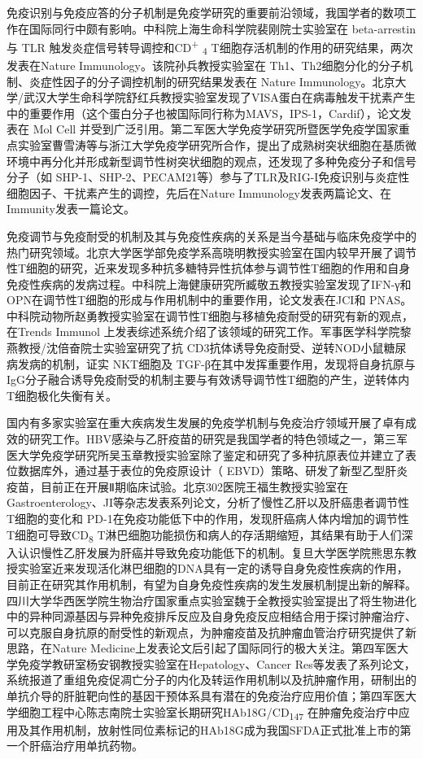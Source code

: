 免疫识别与免疫应答的分子机制是免疫学研究的重要前沿领域，我国学者的数项工作在国际同行中颇有影响。中科院上海生命科学院裴刚院士实验室在
beta-arrestin与 TLR 触发炎症信号转导调控和CD\textsuperscript{+}
\textsubscript{4} T细胞存活机制的作用的研究结果，两次发表在Nature
Immunology。该院孙兵教授实验室在
Th1、Th2细胞分化的分子机制、炎症性因子的分子调控机制的研究结果发表在
Nature
Immunology。北京大学/武汉大学生命科学院舒红兵教授实验室发现了VISA蛋白在病毒触发干扰素产生中的重要作用（这个蛋白分子也被国际同行称为MAVS，IPS-1，Cardif），论文发表在
Mol Cell
并受到广泛引用。第二军医大学免疫学研究所暨医学免疫学国家重点实验室曹雪涛等与浙江大学免疫学研究所合作，提出了成熟树突状细胞在基质微环境中再分化并形成新型调节性树突状细胞的观点，还发现了多种免疫分子和信号分子（如
SHP-1、SHP-2、PECAM21等）参与了TLR及RIG-I免疫识别与炎症性细胞因子、干扰素产生的调控，先后在Nature
Immunology发表两篇论文、在 Immunity发表一篇论文。

免疫调节与免疫耐受的机制及其与免疫性疾病的关系是当今基础与临床免疫学中的热门研究领域。北京大学医学部免疫学系高晓明教授实验室在国内较早开展了调节性T细胞的研究，近来发现多种抗多糖特异性抗体参与调节性T细胞的作用和自身免疫性疾病的发病过程。中科院上海健康研究所臧敬五教授实验室发现了IFN-γ和OPN在调节性T细胞的形成与作用机制中的重要作用，论文发表在JCI和
PNAS。中科院动物所赵勇教授实验室在调节性T细胞与移植免疫耐受的研究有新的观点，在Trends
Immunol
上发表综述系统介绍了该领域的研究工作。军事医学科学院黎燕教授/沈倍奋院士实验室研究了抗
CD3抗体诱导免疫耐受、逆转NOD小鼠糖尿病发病的机制，证实 NKT细胞及
TGF-β在其中发挥重要作用，发现将自身抗原与
IgG分子融合诱导免疫耐受的机制主要与有效诱导调节性T细胞的产生，逆转体内
T细胞极化失衡有关。

国内有多家实验室在重大疾病发生发展的免疫学机制与免疫治疗领域开展了卓有成效的研究工作。HBV感染与乙肝疫苗的研究是我国学者的特色领域之一，第三军医大学免疫学研究所吴玉章教授实验室除了鉴定和研究了多种抗原表位并建立了表位数据库外，通过基于表位的免疫原设计（
EBVD）策略、研发了新型乙型肝炎疫苗，目前正在开展Ⅱ期临床试验。北京302医院王福生教授实验室在Gastroenterology、JI等杂志发表系列论文，分析了慢性乙肝以及肝癌患者调节性T细胞的变化和
PD-1在免疫功能低下中的作用，发现肝癌病人体内增加的调节性T细胞可导致CD\textsubscript{8}
T淋巴细胞功能损伤和病人的存活期缩短，其结果有助于人们深入认识慢性乙肝发展为肝癌并导致免疫功能低下的机制。复旦大学医学院熊思东教授实验室近来发现活化淋巴细胞的DNA具有一定的诱导自身免疫性疾病的作用，目前正在研究其作用机制，有望为自身免疫性疾病的发生发展机制提出新的解释。四川大学华西医学院生物治疗国家重点实验室魏于全教授实验室提出了将生物进化中的异种同源基因与异种免疫排斥反应及自身免疫反应相结合用于探讨肿瘤治疗、可以克服自身抗原的耐受性的新观点，为肿瘤疫苗及抗肿瘤血管治疗研究提供了新思路，在Nature
Medicine上发表论文后引起了国际同行的极大关注。第四军医大学免疫学教研室杨安钢教授实验室在Hepatology、Cancer
Res等发表了系列论文，系统报道了重组免疫促凋亡分子的内化及转运作用机制以及抗肿瘤作用，研制出的单抗介导的肝脏靶向性的基因干预体系具有潜在的免疫治疗应用价值；第四军医大学细胞工程中心陈志南院士实验室长期研究HAb18G/CD\textsubscript{147}
在肿瘤免疫治疗中应用及其作用机制，放射性同位素标记的HAb18G成为我国SFDA正式批准上市的第一个肝癌治疗用单抗药物。


